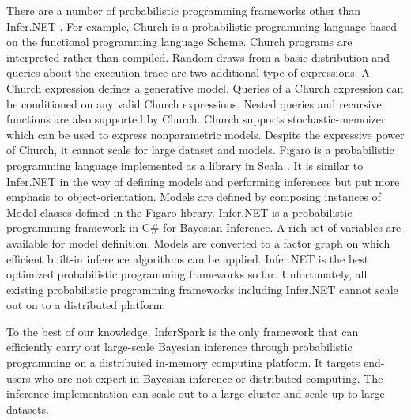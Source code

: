 There are a number of probabilistic programming frameworks other than
Infer.NET \cite{InferNET14}.  For example, Church \cite{GMR+08} is a
probabilistic programming language based on the functional programming
language Scheme.  Church programs are interpreted rather than compiled.
Random draws from a basic distribution and queries about the execution trace
are two additional type of expressions. A Church expression defines a
generative model. Queries of a Church expression can be conditioned on any
valid Church expressions. Nested queries and recursive functions are also
supported by Church. Church supports stochastic-memoizer which can be used to
express nonparametric models.  Despite the expressive power of Church, it
cannot scale for large dataset and models.  Figaro is a probabilistic
programming language implemented as a library in Scala \cite{Figaro}.  It is
similar to Infer.NET in the way of defining models and performing inferences
but put more emphasis to object-orientation. Models are defined by composing
instances of Model classes defined in the Figaro library.  Infer.NET is a
probabilistic programming framework in C\# for Bayesian Inference. A rich set
of variables are available for model definition. Models are converted to a
factor graph on which efficient built-in inference algorithms can be applied.
Infer.NET is the best optimized probabilistic programming frameworks so far.
Unfortunately, all existing probabilistic programming frameworks including
Infer.NET cannot scale out on to a distributed platform.

To the best of our knowledge, InferSpark is the only framework that can
efficiently carry out large-scale Bayesian inference through probabilistic
programming on a distributed in-memory computing platform. It targets
end-users who are not expert in Bayesian inference or distributed computing.
The inference implementation can scale out to a large cluster and scale up to
large datasets.

%










